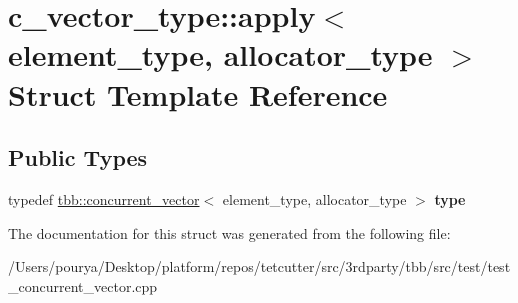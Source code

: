 \hypertarget{structc__vector__type_1_1apply}{}\section{c\+\_\+vector\+\_\+type\+:\+:apply$<$ element\+\_\+type, allocator\+\_\+type $>$ Struct Template Reference}
\label{structc__vector__type_1_1apply}
\subsection*{Public Types}
\begin{DoxyCompactItemize}
\item 
\hypertarget{structc__vector__type_1_1apply_a46026f8f15a6f04fce780305b67946b5}{}typedef \hyperlink{classtbb_1_1concurrent__vector}{tbb\+::concurrent\+\_\+vector}$<$ element\+\_\+type, allocator\+\_\+type $>$ {\bfseries type}\label{structc__vector__type_1_1apply_a46026f8f15a6f04fce780305b67946b5}

\end{DoxyCompactItemize}


The documentation for this struct was generated from the following file\+:\begin{DoxyCompactItemize}
\item 
/\+Users/pourya/\+Desktop/platform/repos/tetcutter/src/3rdparty/tbb/src/test/test\+\_\+concurrent\+\_\+vector.\+cpp\end{DoxyCompactItemize}
